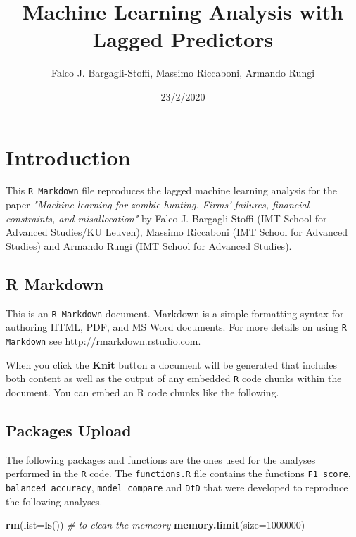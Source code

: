 \documentclass[]{article}
\title{Machine Learning Analysis with Lagged Predictors}
\author{Falco J. Bargagli-Stoffi, Massimo Riccaboni, Armando Rungi}
\date{23/2/2020}
\newenvironment{Shaded}{\begin{snugshade}}{\end{snugshade}}
\newcommand{\CommentTok}[1]{\textcolor[rgb]{0.56,0.35,0.01}{\textit{#1}}}
\newcommand{\DataTypeTok}[1]{\textcolor[rgb]{0.13,0.29,0.53}{#1}}
\newcommand{\DecValTok}[1]{\textcolor[rgb]{0.00,0.00,0.81}{#1}}
\newcommand{\KeywordTok}[1]{\textcolor[rgb]{0.13,0.29,0.53}{\textbf{#1}}}
\newcommand{\NormalTok}[1]{#1}
\begin{document}
\maketitle

\hypertarget{introduction}{%
\section{Introduction}\label{introduction}}

This \texttt{R Markdown} file reproduces the lagged machine learning
analysis for the paper
\textit{"Machine learning for zombie hunting. Firms' failures, financial constraints, and misallocation"}
by Falco J. Bargagli-Stoffi (IMT School for Advanced Studies/KU Leuven),
Massimo Riccaboni (IMT School for Advanced Studies) and Armando Rungi
(IMT School for Advanced Studies).

\hypertarget{r-markdown}{%
\subsection{R Markdown}\label{r-markdown}}

This is an \texttt{R Markdown} document. Markdown is a simple formatting
syntax for authoring HTML, PDF, and MS Word documents. For more details
on using \texttt{R Markdown} see \url{http://rmarkdown.rstudio.com}.

When you click the \textbf{Knit} button a document will be generated
that includes both content as well as the output of any embedded
\texttt{R} code chunks within the document. You can embed an R code
chunks like the following.

\hypertarget{packages-upload}{%
\subsection{Packages Upload}\label{packages-upload}}

The following packages and functions are the ones used for the analyses
performed in the \texttt{R} code. The \texttt{functions.R} file contains
the functions \texttt{F1\_score}, \texttt{balanced\_accuracy},
\texttt{model\_compare} and \texttt{DtD} that were developed to
reproduce the following analyses.

\begin{Shaded}
\begin{Highlighting}[]
\KeywordTok{rm}\NormalTok{(}\DataTypeTok{list=}\KeywordTok{ls}\NormalTok{()) }\CommentTok{# to clean the memeory}
\KeywordTok{memory.limit}\NormalTok{(}\DataTypeTok{size=}\DecValTok{1000000}\NormalTok{)}
\end{Highlighting}
\end{Shaded}
\end{document}
